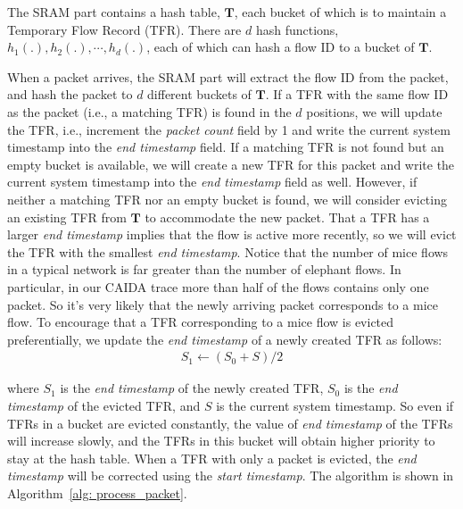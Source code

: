 \documentclass[10pt, conference, letterpaper]{IEEEtran}
\begin{document}
The SRAM part contains a hash table, $\mathbf{T}$, each bucket of which is to maintain a Temporary Flow Record (TFR). There are $d$ hash functions, $h_1(.), h_2(.), \cdots, h_d(.)$, each of which can hash a flow ID to a bucket of $\mathbf{T}$.

When a packet arrives, the SRAM part will extract the flow ID from the packet, and hash the packet to $d$ different buckets of $\mathbf{T}$. If a TFR with the same flow ID as the packet (i.e., a matching TFR) is found in the $d$ positions, we will update the TFR, i.e., increment the \emph{packet count} field by 1 and write the current system timestamp into the \emph{end timestamp} field. If a matching TFR is not found but an empty bucket is available, we will create a new TFR for this packet and write the current system timestamp into the \emph{end timestamp} field as well. However, if neither a matching TFR nor an empty bucket is found, we will consider evicting an existing TFR from $\mathbf{T}$ to accommodate the new packet. That a TFR has a larger \emph{end timestamp} implies that the flow is active more recently, so we will evict the TFR with the smallest \emph{end timestamp}. Notice that the number of mice flows in a typical network is far greater than the number of elephant flows. In particular, in our CAIDA trace more than half of the flows contains only one packet. So it's very likely that the newly arriving packet corresponds to a mice flow. To encourage that a TFR corresponding to a mice flow is evicted preferentially, we update the \emph{end timestamp} of a newly created TFR as follows:
\begin{eqnarray}
S_1 \gets (S_0 + S)/2
\end{eqnarray}

where $S_1$ is the \emph{end timestamp} of the newly created TFR, $S_0$ is the \emph{end timestamp} of the evicted TFR, and $S$ is the current system timestamp. So even if TFRs in a bucket are evicted constantly, the value of \emph{end timestamp} of the TFRs will increase slowly, and the TFRs in this bucket will obtain higher priority to stay at the hash table. When a TFR with only a packet is evicted, the \emph{end timestamp} will be corrected using the \emph{start timestamp}. The algorithm is shown in Algorithm~\ref{alg: process_packet}.
\end{document}
